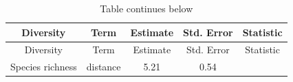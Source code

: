\documentclass[]{article}
\begin{document}
\begin{longtable}[]{@{}ccccc@{}}
\caption{Table continues below}\tabularnewline
\toprule
\begin{minipage}[b]{0.21\columnwidth}\centering\strut
Diversity\strut
\end{minipage} & \begin{minipage}[b]{0.25\columnwidth}\centering\strut
Term\strut
\end{minipage} & \begin{minipage}[b]{0.12\columnwidth}\centering\strut
Estimate\strut
\end{minipage} & \begin{minipage}[b]{0.14\columnwidth}\centering\strut
Std. Error\strut
\end{minipage} & \begin{minipage}[b]{0.14\columnwidth}\centering\strut
Statistic\strut
\end{minipage}\tabularnewline
\midrule
\endfirsthead
\toprule
\begin{minipage}[b]{0.21\columnwidth}\centering\strut
Diversity\strut
\end{minipage} & \begin{minipage}[b]{0.25\columnwidth}\centering\strut
Term\strut
\end{minipage} & \begin{minipage}[b]{0.12\columnwidth}\centering\strut
Estimate\strut
\end{minipage} & \begin{minipage}[b]{0.14\columnwidth}\centering\strut
Std. Error\strut
\end{minipage} & \begin{minipage}[b]{0.14\columnwidth}\centering\strut
Statistic\strut
\end{minipage}\tabularnewline
\midrule
\endhead
\begin{minipage}[t]{0.21\columnwidth}\centering\strut
Species richness\strut
\end{minipage} & \begin{minipage}[t]{0.25\columnwidth}\centering\strut
distance\strut
\end{minipage} & \begin{minipage}[t]{0.12\columnwidth}\centering\strut
5.21\strut
\end{minipage} & \begin{minipage}[t]{0.14\columnwidth}\centering\strut
0.54\strut
\end{minipage} & \begin{minipage}[t]{0.14\columnwidth}\centering\strut

\end{minipage}
\end{longtable}
\end{document}
